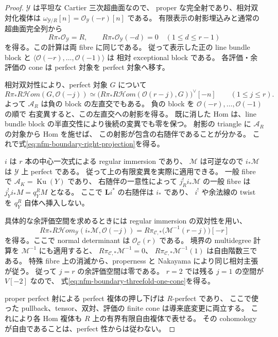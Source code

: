 \begin{proof}
$\mathcal Y$ は平坦な Cartier 三次超曲面なので、
proper な完全射であり、相対双対化複体は
$\omega_{\mathcal Y/R}[n]=\mathcal O_{\mathcal Y}(-r)[n]$ である。
有限表示の射影埋込みと通常の超曲面完全列から
\[
 R\pi_*\mathcal O_{\mathcal Y}=R,\qquad
 R\pi_*\mathcal O_{\mathcal Y}(-d)=0\quad(1\le d\le r-1)
\]
を得る。この計算は両 fibre に同じである。
従って表示した正の line bundle block と
$\langle\mathcal O(-r),\ldots,\mathcal O(-1)\rangle$ は
相対 exceptional block である。
各評価・余評価の cone は perfect 対象を perfect 対象へ移す。

相対双対性により、perfect 対象 $G$ について
\[
 R\pi_*R\mathcal Hom(G,\mathcal O(-j))
 \simeq
 \bigl(R\pi_*R\mathcal Hom(\mathcal O(r-j),G)\bigr)^\vee[-n]
 \qquad(1\le j\le r).
\]
よって $\mathcal A_R$ は負の block の左直交でもある。
負の block を $\mathcal O(-r),\ldots,\mathcal O(-1)$ の順で
右変異すると、この左直交への射影を得る。
既に消した Hom は、line bundle block の半直交性により後続の変異でも零を保つ。
射影の triangle に $\mathcal A_R$ の対象から Hom を施せば、
この射影が包含の右随伴であることが分かる。
これで式\eqref{eq:nfm-boundary-right-projection}を得る。

$i$ は $r$ 本の中心一次式による regular immersion であり、
$\mathcal M$ は可逆なので $i_*\mathcal M$ は $\mathcal Y$ 上 perfect である。
従って上の有限変異を実際に適用できる。
一般 fibre で $\mathcal A_K=\operatorname{Ku}(Y)$ であり、
右随伴の一意性によって $j_R^!i_*\mathcal M$ の一般 fibre は
$j_Y^!i_*M=q_Y^RM$ となる。
ここで $\mathbf Li^*$ の右随伴は $i_*$ であり、
$i^!$ や余法線の twist を $q_Y^R$ 自体へ挿入しない。

具体的な余評価空間を求めるときには regular immersion の双対性を用い、
\begin{equation}\label{eq:nfm-boundary-coevaluation-space}
 R\pi_*R\mathcal Hom_{\mathcal Y}(i_*\mathcal M,\mathcal O(-j))
 =R\pi_{\mathcal C,*}\bigl(\mathcal M^{-1}(r-j)\bigr)[-r]
\end{equation}
を得る。ここで normal determinant は $\mathcal O_{\mathcal C}(r)$ である。
境界の multidegree 計算を $\mathcal M^{-1}$ にも適用すると、
$R\pi_{\mathcal C,*}\mathcal M^{-1}=0$、
$R\pi_{\mathcal C,*}\mathcal M^{-1}(1)$ は自由階数三である。
特殊 fibre 上の消滅から、properness と Nakayama により同じ相対主張が従う。
従って $j=r$ の余評価空間は零である。
$r=2$ では残る $j=1$ の空間が $V[-2]$ なので、
式\eqref{eq:nfm-boundary-threefold-one-cone}を得る。

proper perfect 射による perfect 複体の押し下げは $R$-perfect であり、
ここで使った pullback、tensor、双対、評価の finite cone は導来底変更に両立する。
これにより各 Hom 複体も $R$ 上の有界有限自由複体で表せる。
その cohomology が自由であることは、perfect 性からは従わない。
\end{proof}

